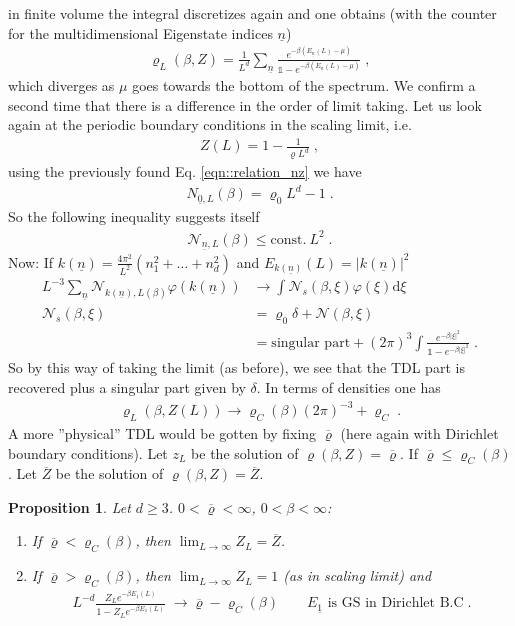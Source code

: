 \documentclass[
a4paper, %
11pt, %
onecolumn, %
openany, %
]{memoir}
\theoremstyle{definition}
\theoremstyle{remark}
\theoremstyle{plain}
\newtheorem{prop}{Proposition}[chapter]
\begin{document}
in finite volume the integral discretizes again and one obtains (with the counter for the multidimensional Eigenstate indices $\underline{n}$)\begin{align}
\varrho_{L}(\beta,Z)=\frac{1}{L^d}\sum_{\underline{n}}\frac{e^{-\beta(E_{\underline{n}}(L)-\mu)}}{\mathds{1}-e^{-\beta(E_{\underline{n}}(L)-\mu)}}\; ,
\end{align}
which diverges as $\mu$ goes towards the bottom of the spectrum. We confirm a second time that there is a difference in the order of limit taking. Let us look again at the periodic boundary conditions in the scaling limit, i.e. \begin{align}
Z(L)=1-\frac{1}{\varrho L^d}\; ,
\end{align}
using the previously found Eq. \eqref{eqn::relation_nz} we have \begin{align}
N_{\underline{0},L}(\beta)=\varrho_0L^d-1\; .
\end{align}
So the following inequality suggests itself \begin{align}
\mathcal{N}_{\underline{n},L}(\beta)\leq \mathrm{const.}~L^2\; .
\end{align}
Now: If $k(\underline{n})=\frac{4\pi^2}{L^2}(n_1^2+\ldots+n_d^2)$ and $E_{k(\underline{n})}(L)=|k(\underline{n})|^2$ \begin{align}
L^{-3}\sum_{\underline{n}}\mathcal{N}_{k(\underline{n}),L(\beta)}\varphi(k(\underline{n}))&\longrightarrow \int\mathcal{N}_s(\beta,\xi)\varphi(\xi)\mathrm{d}\xi\\
\mathcal{N}_s(\beta,\xi)&=\varrho_0\delta+\mathcal{N}(\beta,\xi)\\
&=\text{singular part} + (2\pi)^3\int\frac{e^{-\beta|\xi|^2}}{\mathds{1}-e^{-\beta|\xi|^2}}\;.
\end{align}
So by this way of taking the limit (as before), we see that the TDL part is recovered plus a singular part given by $\delta$. In terms of densities one has \begin{align}
\varrho_L(\beta,Z(L))\rightarrow\varrho_C(\beta)(2\pi)^{-3}+\varrho_C\; .
\end{align}
A more ''physical'' TDL would be gotten by fixing $\overline{\varrho}$ (here again with Dirichlet boundary conditions). Let $z_L$ be the solution of $\varrho(\beta,Z)=\overline{\varrho}$. If $\overline{\varrho}\leq \varrho_C(\beta)$. Let $\overline{Z}$ be the solution of $\varrho(\beta,Z)=\overline{Z}$. \begin{prop}
	Let $d\geq 3$. $0<\overline{\varrho}<\infty$, $0<\beta<\infty$: \begin{enumerate}
		\item If $\overline{\varrho}<\varrho_C(\beta)$, then $\lim_{L\rightarrow\infty}Z_L=\overline{Z}$.
		\item If $\overline{\varrho}>\varrho_C(\beta)$, then $\lim_{L\rightarrow\infty}Z_L=1$ (as in scaling limit) and \begin{align}
		L^{-d}\frac{Z_Le^{-\beta E_{\underline{1}}(L)}}{1-Z_Le^{-\beta E_{\underline{1}}(L)}}\; \longrightarrow \overline{\varrho}-\varrho_C(\beta)\qquad E_{\underline{1}}\text{ is GS in Dirichlet B.C}\; .
		\end{align}
	\end{enumerate}
\end{prop}
\end{document}
